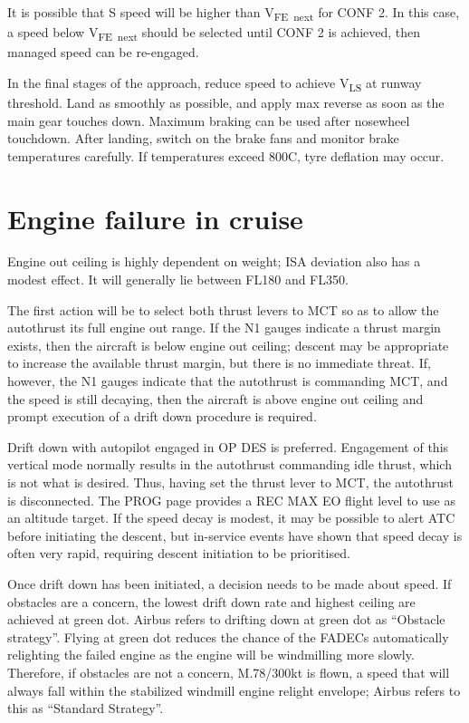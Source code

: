 \documentclass[a5paper,11pt,twoside]{book}
\newcommand{\inlcite}[1]{{\footnotesize\scshape\MakeLowercase{[#1]}}}
\newcommand{\multicite}[1]{%

  \nopagebreak
  \noindent{{\color{blue}\inlcite{#1}}}
}
\newcommand{\V}[1]{V\textsubscript{#1}}
\begin{document}
It is possible that S speed will be higher than \V{FE~next} for CONF 2. In this
case, a speed below \V{FE~next} should be selected until CONF 2 is achieved,
then managed speed can be re-engaged.

In the final stages of the approach, reduce speed to achieve \V{LS} at runway
threshold. Land as smoothly as possible, and apply max reverse as soon as the
main gear touches down. Maximum braking can be used after nosewheel
touchdown. After landing, switch on the brake fans and monitor brake
temperatures carefully. If temperatures exceed 800\textdegree C, tyre deflation may occur.

\multicite{QRH~AER.MISC, FCOM~PRO.AER.MISC, FCTM~PRO.AER.MISC}

\section{Engine failure in cruise}

Engine out ceiling is highly dependent on weight; ISA deviation also has a
modest effect. It will generally lie between FL180 and FL350.

The first action will be to select both thrust levers to MCT so as to allow the
autothrust its full engine out range. If the N1 gauges indicate a thrust margin
exists, then the aircraft is below engine out ceiling; descent may be
appropriate to increase the available thrust margin, but there is no immediate
threat. If, however, the N1 gauges indicate that the autothrust is commanding
MCT, and the speed is still decaying, then the aircraft is above engine out
ceiling and prompt execution of a drift down procedure is required.

Drift down with autopilot engaged in OP DES is preferred. Engagement of this
vertical mode normally results in the autothrust commanding idle thrust, which
is not what is desired. Thus, having set the thrust lever to MCT, the autothrust
is disconnected. The PROG page provides a REC MAX EO flight level to use as an
altitude target. If the speed decay is modest, it may be possible to alert ATC
before initiating the descent, but in-service events have shown that speed decay
is often very rapid, requiring descent initiation to be prioritised.

Once drift down has been initiated, a decision needs to be made about speed. If
obstacles are a concern, the lowest drift down rate and highest ceiling are
achieved at green dot. Airbus refers to drifting down at green dot as ``Obstacle
strategy''. Flying at green dot reduces the chance of the FADECs automatically
relighting the failed engine as the engine will be windmilling more
slowly. Therefore, if obstacles are not a concern, M.78/300kt is flown, a speed
that will always fall within the stabilized windmill engine relight envelope;
Airbus refers to this as ``Standard Strategy''.
\end{document}
